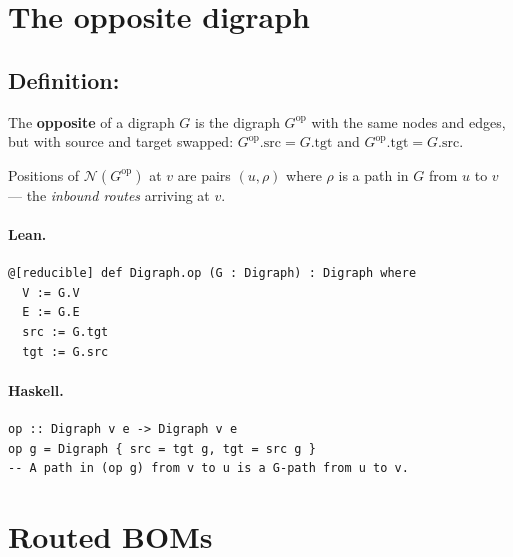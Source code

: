 \documentclass[11pt,a4paper]{article}
\begin{document}
\section{The opposite digraph}

\subsection{Definition: }

\begin{defn}
The \textbf{opposite} of a digraph $G$ is the digraph $G^{\mathrm{op}}$ with
the same nodes and edges, but with source and target swapped:
$G^{\mathrm{op}}.\mathrm{src} = G.\mathrm{tgt}$ and
$G^{\mathrm{op}}.\mathrm{tgt} = G.\mathrm{src}$.

Positions of $\mathcal{N}(G^{\mathrm{op}})$ at $v$ are pairs $(u, \rho)$
where $\rho$ is a path in $G$ from $u$ to $v$ --- the \emph{inbound routes}
arriving at $v$.
\end{defn}

\paragraph{Lean.}
\begin{lstlisting}[style=lean]
@[reducible] def Digraph.op (G : Digraph) : Digraph where
  V := G.V
  E := G.E
  src := G.tgt
  tgt := G.src
\end{lstlisting}

\paragraph{Haskell.}
\begin{lstlisting}[style=haskell]
op :: Digraph v e -> Digraph v e
op g = Digraph { src = tgt g, tgt = src g }
-- A path in (op g) from v to u is a G-path from u to v.
\end{lstlisting}


\section{Routed BOMs}
\end{document}
